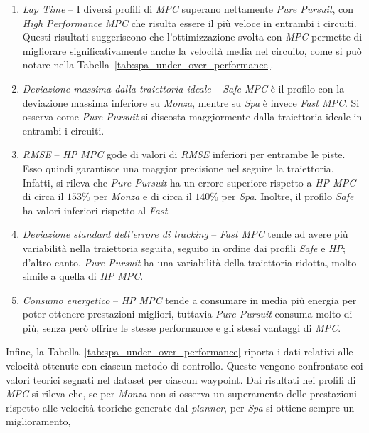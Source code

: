 \begin{enumerate}
    \item \textit{Lap Time} -- I diversi profili di \textit{MPC} superano 
    nettamente \textit{Pure Pursuit}, con \textit{High Performance MPC} che 
    risulta essere il più veloce in entrambi i circuiti. Questi risultati 
    suggeriscono che l’ottimizzazione svolta con \textit{MPC} permette di 
    migliorare significativamente anche la velocità media nel circuito, come
    si può notare nella Tabella~\ref{tab:spa_under_over_performance}.
    \item \textit{Deviazione massima dalla traiettoria ideale} -- \textit{Safe MPC} è il profilo 
    con la deviazione massima inferiore su \textit{Monza}, mentre su \textit{Spa} è invece \textit{Fast MPC}.
    Si osserva come \textit{Pure Pursuit} si discosta maggiormente dalla traiettoria ideale in entrambi i circuiti.
    \item \textit{RMSE} -- \textit{HP MPC} gode di valori di \textit{RMSE} inferiori per entrambe 
    le piste. Esso quindi garantisce una maggior precisione nel seguire la traiettoria.
    Infatti, si rileva che \textit{Pure Pursuit} ha un errore superiore rispetto a 
    \textit{HP MPC} di circa il $153 \%$ per \textit{Monza} e di circa il $140 \%$ per \textit{Spa}. 
    Inoltre, il profilo \textit{Safe} ha valori inferiori rispetto al \textit{Fast}. 
    \item \textit{Deviazione standard dell'errore di tracking} -- 
    \textit{Fast MPC} tende ad avere più variabilità nella traiettoria 
    seguita, seguito in ordine dai profili \textit{Safe} e \textit{HP}; 
    d'altro canto, \textit{Pure Pursuit} ha una variabilità della 
    traiettoria ridotta, molto simile a quella di \textit{HP MPC}.
    \item \textit{Consumo energetico} -- \textit{HP MPC} tende a consumare
    in media più energia per poter ottenere prestazioni migliori, tuttavia
    \textit{Pure Pursuit} consuma molto di più, senza però offrire le stesse performance e gli stessi vantaggi di \textit{MPC}.
\end{enumerate}
Infine, la Tabella~\ref{tab:spa_under_over_performance} riporta i dati relativi 
alle velocità ottenute con ciascun metodo di controllo. Queste vengono confrontate coi 
valori teorici segnati nel dataset per ciascun waypoint. 
Dai risultati nei profili di \textit{MPC} si rileva che, se per \textit{Monza}
non si osserva un superamento delle prestazioni rispetto alle velocità teoriche 
generate dal \textit{planner}, per \textit{Spa} si ottiene sempre un miglioramento,
